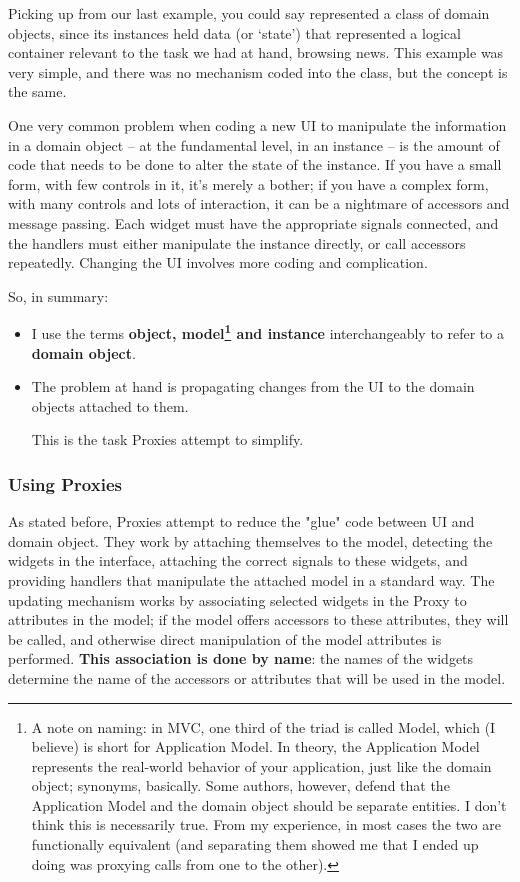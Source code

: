 \documentclass[a4paper]{howto}
\begin{document}
Picking up from our last example, you could say 
represented a class of domain objects, since its instances held data (or
`state') that represented a logical container relevant to the task we
had at hand, browsing news.  This example was very simple, and there was
no mechanism coded into the  class, but the concept is
the same.

One very common problem when coding a new UI to manipulate the
information in a domain object -- at the fundamental level, in an
instance -- is the amount of code that needs to be done to alter the
state of the instance. If you have a small form, with few controls in
it, it's merely a bother; if you have a complex form, with many controls
and lots of interaction, it can be a nightmare of accessors and message
passing. Each widget must have the appropriate signals connected, and
the handlers must either manipulate the instance directly, or call
accessors repeatedly. Changing the UI involves more coding and
complication.

So, in summary:

\begin{itemize}
\item I use the terms {\bf object, model\footnote{A note on naming: in
MVC, one third of the triad is called Model, which (I believe) is short
for Application Model. In theory, the Application Model represents the
real-world behavior of your application, just like the domain object;
synonyms, basically. Some authors, however, defend that the Application
Model and the domain object should be separate entities. I don't think
this is necessarily true.  From my experience, in most cases the two are
functionally equivalent (and separating them showed me that I ended up
doing was proxying calls from one to the other).} and instance}
interchangeably to refer to a {\bf domain object}.
\item The problem at hand is propagating changes from the UI to the
domain objects attached to them.

This is the task Proxies attempt to simplify.
\end{itemize}

\subsubsection{Using Proxies}

As stated before, Proxies attempt to reduce the "glue" code between UI
and domain object.  They work by attaching themselves to the model,
detecting the widgets in the interface, attaching the correct signals to
these widgets, and providing handlers that manipulate the attached model
in a standard way.  The updating mechanism works by associating selected
widgets in the Proxy to attributes in the model; if the model offers
accessors to these attributes, they will be called, and otherwise direct
manipulation of the model attributes is performed. {\bf This association
is done by name}: the names of the widgets determine the name of the
accessors or attributes that will be used in the model.
\end{document}
